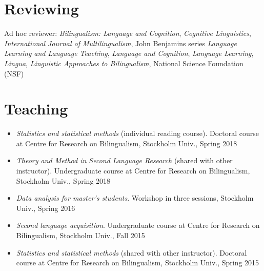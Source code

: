 \documentclass[margin, 11pt]{res} %
\begin{document}
\begin{resume}


\section{\sc Reviewing}

Ad hoc reviewer: 
\textit{Bilingualism: Language and Cognition},
\textit{Cognitive Linguistics},
\textit{International Journal of Multilingualism},
John Benjamins series \textit{Language Learning and Language Teaching},
\textit{Language and Cognition},
\textit{Language Learning},
\textit{Lingua},
\textit{Linguistic Approaches to Bilingualism},
National Science Foundation (NSF)





\section{\sc Teaching}

\begin{itemize}

\item \textit{Statistics and statistical methods} (individual reading course). Doctoral course at Centre for Research on Bilingualism, Stockholm Univ., Spring 2018

\item \textit{Theory and Method in Second Language Research} (shared with other instructor). Undergraduate course at Centre for Research on Bilingualism, Stockholm Univ., Spring 2018

\item \textit{Data analysis for master's students}. Workshop in three sessions, Stockholm Univ., Spring 2016

\item \textit{Second language acquisition}. Undergraduate course at Centre for Research on Bilingualism, Stockholm Univ., Fall 2015

\item \textit{Statistics and statistical methods} (shared with other instructor). Doctoral course at Centre for Research on Bilingualism, Stockholm Univ., Spring 2015


\end{itemize}
\end{resume}
\end{document}

